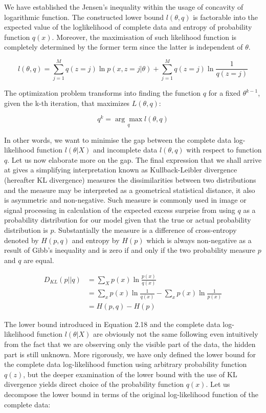We have established the Jensen's inequality within the usage of concavity of logarithmic function. The constructed lower bound $l(\theta,q)$ is factorable into the expected value of the loglikelihood of complete data and entropy of probability function $q(x)$. Moreover, the maximisation of such likelihood function is completely determined by the former term since the latter is independent of $\theta$.

\begin{equation}
l(\theta,q) = \sum_{j=1}^{M} q(z = j) \ln p(x, z = j|\theta) + \sum_{j=1}^{M} q(z = j) \ln \frac{1}{q(z = j)}
\end{equation}

The optimization problem transforms into finding the function $q$ for a fixed $\theta^{k-1}$, given the k-th iteration, that maximizes $L(\theta, q)$:

\begin{equation}
q^{k} = \underset{q}{\arg\max} l(\theta, q)
\end{equation}

In other words, we want to minimise the gap between the complete data log-likelihood function $l(\theta|X)$ and incomplete data $l(\theta, q)$ with respect to function $q$. Let us now elaborate more on the gap. The final expression that we shall arrive at gives a simplifying interpretation known as Kullback-Leibler divergence (hereafter KL divergence) measures the dissimilarities between two distributions and the measure may be interpreted as a geometrical statistical distance, it also is asymmetric and non-negative. Such measure is commonly used in image or signal processing in calculation of the expected excess surprise from using $q$ as a probability distribution for our model given that the true or actual probability distribution is $p$. Substantially the measure is a difference of cross-entropy denoted by $H(p,q)$ and entropy by $H(p)$ which is always non-negative as a result of Gibb's inequality and is zero if and only if the two probability measure $p$ and $q$ are equal.

\begin{align}
D_{KL} (p || q) &= \sum_{X} p(x) \ln \frac{p(x)}{q(x)} \\
& = \sum_{x} p(x) \ln \frac{1}{q(x)} - \sum_{x} p(x) \ln \frac{1}{p(x)} \\
& = H(p,q) - H(p)
\end{align}

The lower bound introduced in Equation 2.18 and the complete data log-likelihood function $l(\theta|X)$ are obviously not the same following even intuitively from the fact that we are observing only the visible part of the data, the hidden part is still unknown. More rigorously, we have only defined the lower bound for the complete data log-likelihood function using arbitrary probability function $q(z)$, but the deeper examination of the lower bound with the use of KL divergence yields direct choice of the probability function $q(x)$. Let us decompose the lower bound in terms of the original log-likelihood function of the complete data:

